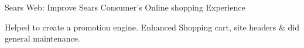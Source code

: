 \documentclass[]{de-resume}
\begin{document}
\begin{minipage}[t]{0.66\textwidth}
\subsectionsep
{}
\subsectionsep
\begin{tightemize}
\item Sears Web: Improve Sears Consumer's Online shopping Experience
	\begin{tightemize}
		\sectionsep
		\item Helped to create a promotion engine. Enhanced Shopping cart, site headers \& did general maintenance.
		\sectionsep
	\end{tightemize}
\end{tightemize}

\end{minipage} 
\end{document}

